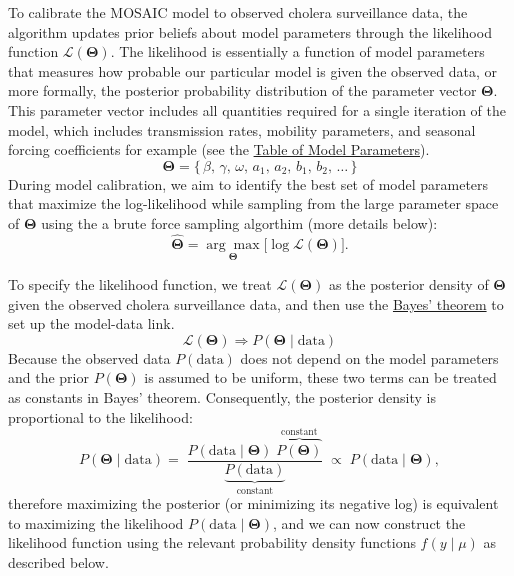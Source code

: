 \documentclass[
]{book}
\begin{document}
To calibrate the MOSAIC model to observed cholera surveillance data, the algorithm updates prior beliefs about model parameters through the likelihood function \(\mathcal{L}(\boldsymbol{\Theta})\). The likelihood is essentially a function of model parameters that measures how probable our particular model is given the observed data, or more formally, the posterior probability distribution of the parameter vector \(\boldsymbol{\Theta}\). This parameter vector includes all quantities required for a single iteration of the model, which includes transmission rates, mobility parameters, and seasonal forcing coefficients for example (see the \href{https://www.mosaicmod.org/model-description.html\#table-of-model-parameters}{Table of Model Parameters}).
\begin{equation}
\boldsymbol{\Theta} = \{\, \beta,\, \gamma,\, \omega,\, a_1,\, a_2,\, b_1,\, b_2,\, \dots \, \}
\label{eq:theta}
\end{equation}
During model calibration, we aim to identify the best set of model parameters that maximize the log-likelihood while sampling from the large parameter space of \(\boldsymbol{\Theta}\) using the a brute force sampling algorthim (more details below):
\begin{equation}
\hat{\boldsymbol{\Theta}} = \underset{\boldsymbol{\Theta}}{\arg\max}\big[\log \mathcal{L}(\boldsymbol{\Theta})\big].
\label{eq:general-likelihood}
\end{equation}

To specify the likelihood function, we treat \(\mathcal{L}(\boldsymbol{\Theta})\) as the posterior density of \(\boldsymbol{\Theta}\) given the observed cholera surveillance data, and then use the \href{https://en.wikipedia.org/wiki/Bayes\%27_theorem}{Bayes' theorem} to set up the model-data link.
\begin{equation}
\mathcal{L}(\boldsymbol{\Theta}) \Longrightarrow P(\boldsymbol{\Theta}\mid\text{data})  
\label{eq:bayes-1}
\end{equation}
Because the observed data \(P(\text{data})\) does not depend on the model parameters and the prior \(P(\boldsymbol{\Theta})\) is assumed to be uniform, these two terms can be treated as constants in Bayes' theorem. Consequently, the posterior density is proportional to the likelihood:
\begin{equation}
P(\boldsymbol{\Theta}\mid\text{data})
=\;
\frac{\displaystyle
P(\text{data}\mid\boldsymbol{\Theta})\;
\overbrace{P(\boldsymbol{\Theta})}^{\text{constant}}
}
{\displaystyle
\underbrace{P(\text{data})}_{\text{constant}}
}
\;\propto\;
P(\text{data}\mid\boldsymbol{\Theta}),
\label{eq:bayes-2}
\end{equation}
therefore maximizing the posterior (or minimizing its negative log) is equivalent to maximizing the likelihood \(P(\text{data}\mid\boldsymbol{\Theta})\), and we can now construct the likelihood function using the relevant probability density functions \(f(y\mid\mu)\) as described below.
\end{document}
